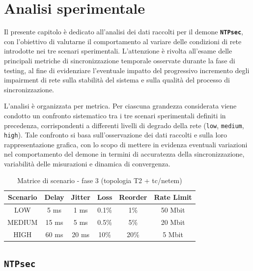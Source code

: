 \chapter{Analisi sperimentale}
\label{cha:NTPsec} \label{cha:NTPsec}

Il presente capitolo è dedicato all’analisi dei dati raccolti per il demone
\texttt{\textbf{NTPsec}}, con l’obiettivo di valutarne il comportamento al
variare delle condizioni di rete introdotte nei tre scenari sperimentali. L’attenzione
è rivolta all’esame delle principali metriche di sincronizzazione temporale osservate
durante la fase di testing, al fine di evidenziare l’eventuale impatto del
progressivo incremento degli impairment di rete sulla stabilità del sistema e
sulla qualità del processo di sincronizzazione.

L’analisi è organizzata per metrica. Per ciascuna grandezza considerata viene condotto
un confronto sistematico tra i tre scenari sperimentali definiti in precedenza,
corrispondenti a differenti livelli di degrado della rete (\texttt{low}, \texttt{medium},
\texttt{high}). Tale confronto si basa sull’osservazione dei dati raccolti e
sulla loro rappresentazione grafica, con lo scopo di mettere in evidenza eventuali
variazioni nel comportamento del demone in termini di accuratezza della sincronizzazione,
variabilità delle misurazioni e dinamica di convergenza.

\vspace{0,2 cm}
\begin{table}[h]
  \centering
  \caption{Matrice di scenario - fase 3 (topologia T2 + tc/netem)}
  \begin{tabular}{|c|c|c|c|c|c|}
    \hline
    \textbf{Scenario} & \textbf{Delay} & \textbf{Jitter} & \textbf{Loss} & \textbf{Reorder} & \textbf{Rate Limit} \\
    \hline
    LOW               & 5 ms           & 1 ms            & 0.1\%         & 1\%              & 50 Mbit             \\
    \hline
    MEDIUM            & 15 ms          & 5 ms            & 0.5\%         & 5\%              & 20 Mbit             \\
    \hline
    HIGH              & 60 ms          & 20 ms           & 10\%          & 20\%             & 5 Mbit              \\
    \hline
  \end{tabular}
  \label{tab:scenario_matrix}
\end{table}
\section{\texttt{NTPsec}}

